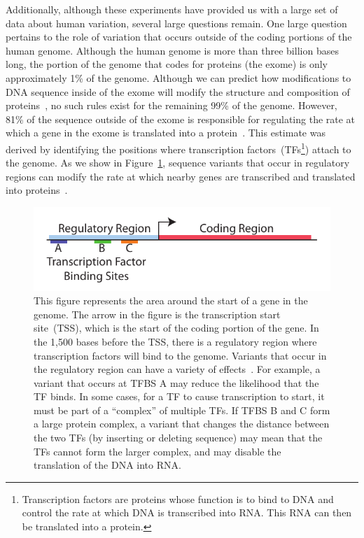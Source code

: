 \documentclass[11pt]{article} %
\begin{document}
Additionally, although these experiments have provided us with a large set of data about
human variation, several large questions remain. One large question pertains to the role of
variation that occurs outside of the coding portions of the human genome. Although the human
genome is more than three billion bases long, the portion of the genome that codes for proteins
(the exome) is only approximately 1\% of the genome. Although we can predict how modifications
to DNA sequence inside of the exome will modify the structure and composition of
proteins~\cite{mclaren10}, no such rules exist for the remaining 99\% of the genome. However,
81\% of the sequence outside of the exome is responsible for regulating the rate at which
a gene in the exome is translated into a protein~\cite{gerstein12}. This estimate was derived
by identifying the positions where transcription factors~(TFs\footnote{Transcription factors are
proteins whose function is to bind to DNA and control the rate at which DNA is transcribed into
RNA. This RNA can then be translated into a protein.}) attach to the genome. As we show in
Figure~\ref{fig:tfbs}, sequence variants that occur in regulatory regions can modify the rate
at which nearby genes are transcribed and translated into proteins~\cite{levo14, weingarten14}.

\begin{figure}[h]
\begin{center}
\includegraphics[width=0.75\linewidth]{tfbs.pdf}
\caption{This figure represents the area around the start of a gene in the genome. The
arrow in the figure is the transcription start site~(TSS), which is the start of the coding
portion of the gene. In the 1,500 bases before the TSS, there is a regulatory region where
transcription factors will bind to the genome. Variants that occur in the regulatory region
can have a variety of effects~\cite{levo14, weingarten14}. For example, a variant that occurs
at TFBS A may reduce the likelihood that the TF binds. In some cases, for a TF to cause
transcription to start, it must be part of a ``complex'' of multiple TFs. If TFBS B and C
form a large protein complex, a variant that changes the distance between the two TFs (by
inserting or deleting sequence) may mean that the TFs cannot form the larger complex, and
may disable the translation of the DNA into RNA.}
\label{fig:tfbs}
\end{center}
\end{figure}
\end{document}
